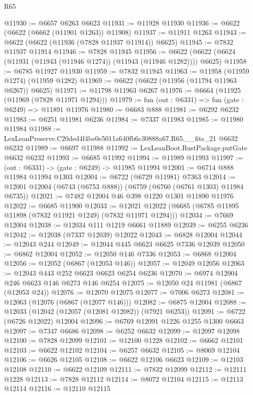 \begin{lexlean}{R65}
\begin{coremodule}
{@11930 := @6657 @6263 @6623
@11931 := @11928 @11930
@11936 := @6622 (@6622 (@6662 (@11901 @1263)) @11908)
@11937 := @11911 @1263
@11943 := @6622 (@6622 (@11936 (@7828 @11937 @11914)) @6625)
@11945 := @7832 @11937 @11914
@11946 := @7828 @11945
@11956 := @6622 (@6622 (@6624 (@11931 (@11943 (@11946 @1274)) (@11943 (@11946 @1282)))) @6625)
@11958 := @6785 @11927 @11930
@11959 := @7832 @11945
@11963 := @11958 (@11959 @1274) (@11959 @1282)
@11969 := @6622 (@6622 (@11956 (@11794 @11963 @6267)) @6625)
@11971 := @11798 @11963 @6267
@11976 := @6664 (@11925 (@11969 (@7828 @11971 @1294)))
@11979 := fun (out : @6331) => fun (gate : @6249) => @11891 @11976
@11980 := @6683 @888
@11981 := @6292 @6232
@11983 := @6251 @11981 @6236
@11984 := @7337 @11983
@11985 := @11980 @11984
@11988 := LexLeanPreserve.C20ded4f4be0e5011a640fb6c30888a67.R65.__fits_21 @6632 @6232
@11989 := @6697 @11988
@11992 := LexLeanBoot.RustPackage.putGate @6632 @6232
@11993 := @6685 @11992
@11994 := @11989 @11993
@11997 := (out : @6331) -> (gate : @6249) -> @11985 @11994
@12001 := @6714 @888 @11984 @11994 @1303
@12004 := @6722 (@6729 @11981) @7363
@12014 := @12001 @12004 (@6743 (@6753 @888)) (@6759 (@6760 (@6761 @1303) @11984 @6735))
@12021 := @7482 @12004 @46 @398 @1220 @1301 @11890 @11976
@12022 := @6685 @11900
@12033 := @12021 @12022 (@6685 (@6785 @11895 @11898 (@7832 @11921 @1249) (@7832 @11971 @1294)))
@12034 := @7669 @12004
@12038 := @12034 @111 @1219 @6661 @11889
@12039 := @6255 @6236
@12042 := @12038 (@7337 @12039) @12022
@12043 := @6828 @12004
@12044 := @12043 @244
@12049 := @12044 @445 @6623 @6625 @7336 @12039
@12050 := @6862 @12004
@12052 := @12050 @146 @7336
@12053 := @6868 @12004
@12056 := @12052 (@6867 (@12053 @146))
@12057 := @12049 @12056
@12063 := @12043 @443 @252 @6623 @6623 @6254 @6236
@12070 := @6974 @12004 @246 @6623 @146 @6273 @146 @6254
@12075 := @12050 @24 @11981 (@6867 (@12053 @24))
@12076 := @12070 @12075
@12077 := @7006 @6273
@12081 := @12063 (@12076 (@6867 (@12077 @146)))
@12082 := @6875 @12004
@12088 := @12033 (@12042 (@12057 (@12081 @12082)) (@7921 @6253))
@12091 := @6722 (@6726 @12022) @12004
@12096 := @6769 @12091 @1226 @1255 @1300 @6663
@12097 := @7347 @6686
@12098 := @6252 @6632
@12099 := @12097 @12098
@12100 := @7828 @12099
@12101 := @12100 @1228
@12102 := @6662 @12101
@12103 := @6622 @12102
@12104 := @6257 @6632
@12105 := @8069 @12104
@12106 := @6626 @12105
@12108 := @6622 @12106 @6623
@12109 := @12103 @12108
@12110 := @6622 @12109
@12111 := @7832 @12099
@12112 := @12111 @1228
@12113 := @7828 @12112
@12114 := @8072 @12104
@12115 := @12113 @12114
@12116 := @12110 @12115
}
\end{coremodule}
\end{lexlean}
